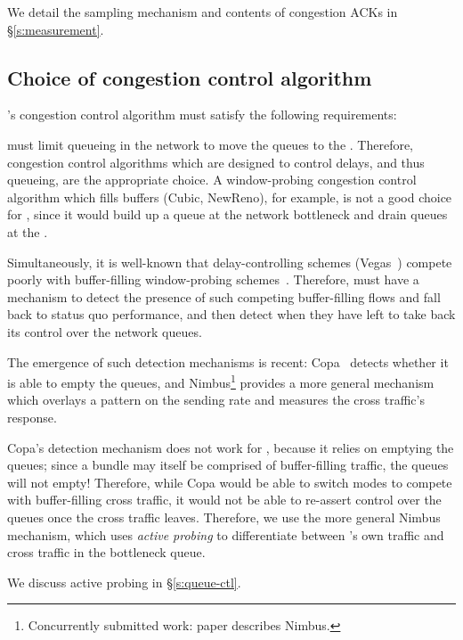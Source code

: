 We detail the sampling mechanism and contents of congestion ACKs in \S\ref{s:measurement}.

\subsection{Choice of congestion control algorithm}\label{s:design:whichcc}
\name's congestion control algorithm must satisfy the following requirements: 

 \name must limit queueing in the network to move the queues to the \inbox. Therefore, congestion control algorithms which are designed to control delays, and thus queueing, are the appropriate choice. 
A window-probing congestion control algorithm which fills buffers (\eg Cubic, NewReno), for example, is not a good choice for \name, since it would build up a queue at the network bottleneck and drain queues at the \inbox.

 Simultaneously, it is well-known that delay-controlling schemes (\eg Vegas~\cite{vegas}) compete poorly with buffer-filling window-probing schemes~\cite{copa}.
Therefore, \name must have a mechanism to detect the presence of such competing buffer-filling flows and fall back to status quo performance, and then detect when they have left to take back its control over the network queues. 

The emergence of such detection mechanisms is recent: Copa~\cite{copa} detects whether it is able to empty the queues, and Nimbus\footnote{Concurrently submitted work: paper  describes Nimbus.} provides a more general mechanism which overlays a pattern on the sending rate and measures the cross traffic's response.

Copa's detection mechanism does not work for \name, because it relies on emptying the queues; since a bundle may itself be comprised of buffer-filling traffic, the queues will not empty! Therefore, while Copa would be able to switch modes to compete with buffer-filling cross traffic, it would not be able to re-assert control over the queues once the cross traffic leaves.
Therefore, we use the more general Nimbus mechanism, which uses \emph{active probing} to differentiate between \name's own traffic and cross traffic in the bottleneck queue.

We discuss active probing in \S\ref{s:queue-ctl}.
